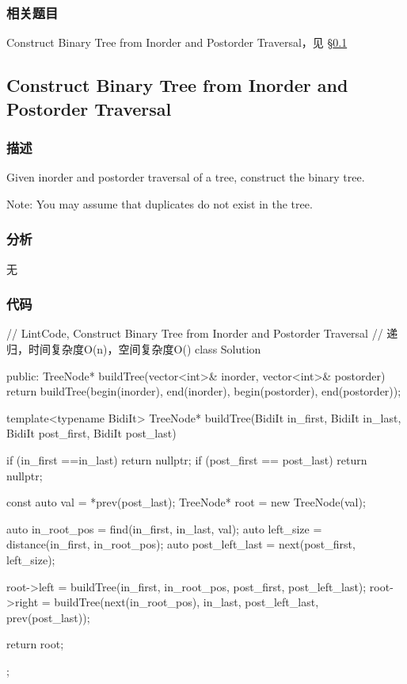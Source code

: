 \subsubsection{相关题目}
\begindot
\item Construct Binary Tree from Inorder and Postorder Traversal，见 \S \ref{sec:construct-binary-tree-from-inorder-and-postorder-traversal}
\myenddot


\subsection{Construct Binary Tree from Inorder and Postorder Traversal}
\label{sec:construct-binary-tree-from-inorder-and-postorder-traversal}


\subsubsection{描述}
Given inorder and postorder traversal of a tree, construct the binary tree.

Note:
You may assume that duplicates do not exist in the tree.


\subsubsection{分析}
无


\subsubsection{代码}
\begin{Code}
// LintCode, Construct Binary Tree from Inorder and Postorder Traversal
// 递归，时间复杂度O(n)，空间复杂度O(\logn)
class Solution {
public:
    TreeNode* buildTree(vector<int>& inorder, vector<int>& postorder) {
        return buildTree(begin(inorder), end(inorder),
                begin(postorder), end(postorder));
    }

    template<typename BidiIt>
    TreeNode* buildTree(BidiIt in_first, BidiIt in_last,
            BidiIt post_first, BidiIt post_last) {
        if (in_first ==in_last) return nullptr;
        if (post_first == post_last) return nullptr;

        const auto val = *prev(post_last);
        TreeNode* root = new TreeNode(val);

        auto in_root_pos = find(in_first, in_last, val);
        auto left_size = distance(in_first, in_root_pos);
        auto post_left_last = next(post_first, left_size);

        root->left = buildTree(in_first, in_root_pos, post_first, post_left_last);
        root->right = buildTree(next(in_root_pos), in_last, post_left_last,
                prev(post_last));

        return root;
    }
};
\end{Code}


